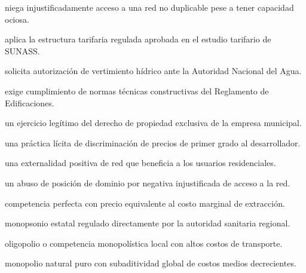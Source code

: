 \begin{opts}
    \item niega injustificadamente acceso a una red no duplicable pese a tener capacidad ociosa.
    \item aplica la estructura tarifaria regulada aprobada en el estudio tarifario de SUNASS.
    \item solicita autorización de vertimiento hídrico ante la Autoridad Nacional del Agua.
    \item exige cumplimiento de normas técnicas constructivas del Reglamento de Edificaciones.
\end{opts}

\begin{opts}
    \item un ejercicio legítimo del derecho de propiedad exclusiva de la empresa municipal.
    \item una práctica lícita de discriminación de precios de primer grado al desarrollador.
    \item una externalidad positiva de red que beneficia a los usuarios residenciales.
    \item un abuso de posición de dominio por negativa injustificada de acceso a la red.
\end{opts}

\begin{opts}
    \item competencia perfecta con precio equivalente al costo marginal de extracción.
    \item monopsonio estatal regulado directamente por la autoridad sanitaria regional.
    \item oligopolio o competencia monopolística local con altos costos de transporte.
    \item monopolio natural puro con subaditividad global de costos medios decrecientes.
\end{opts}

